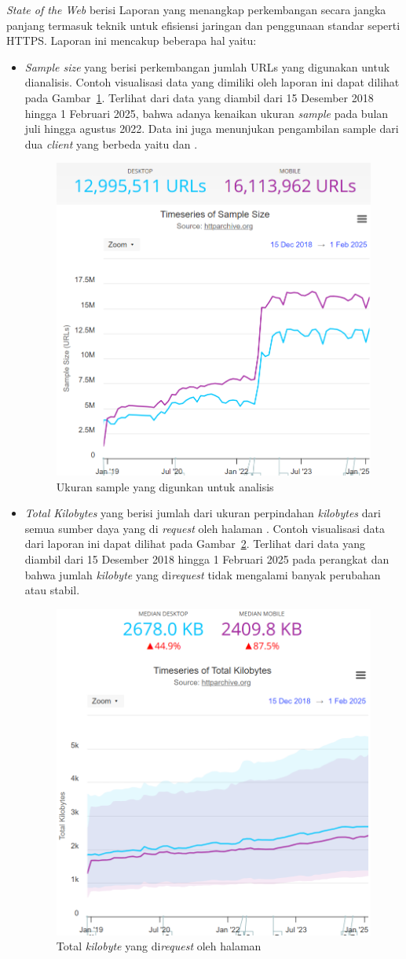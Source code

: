 \textit{State of the Web} berisi Laporan yang menangkap perkembangan \web secara jangka panjang  termasuk teknik untuk efisiensi jaringan dan penggunaan standar seperti HTTPS. Laporan ini mencakup beberapa hal yaitu:
\begin{itemize}
    \item \textit{Sample size} yang berisi perkembangan jumlah URLs yang digunakan untuk dianalisis. Contoh visualisasi data yang dimiliki oleh laporan ini dapat dilihat pada Gambar~\ref{fig:samplesize}. Terlihat dari data yang diambil dari 15 Desember 2018 hingga 1 Februari 2025, bahwa adanya kenaikan ukuran \textit{sample} pada bulan juli hingga agustus 2022. Data ini juga menunjukan pengambilan sample dari dua \textit{client} yang berbeda yaitu \desktop dan \mobile.
    \begin{figure}[H]
        \centering
        \includegraphics[width=0.4\linewidth]{Gambar/Contoh Sample Size.png}
        \caption{Ukuran sample \web yang digunkan untuk analisis}
        \label{fig:samplesize}
    \end{figure}

        
    \item \textit{Total Kilobytes} yang berisi jumlah dari ukuran perpindahan \textit{kilobytes} dari semua sumber daya yang di \textit{request} oleh halaman \web. Contoh visualisasi data dari laporan ini dapat dilihat pada Gambar~\ref{fig:totalkilo}. Terlihat dari data yang diambil dari 15 Desember 2018 hingga 1 Februari 2025 pada perangkat \desktop dan \mobile bahwa jumlah \textit{kilobyte} yang di\textit{request} tidak mengalami banyak perubahan atau stabil.
    \begin{figure}[H]
        \centering
        \includegraphics[width=0.4\linewidth]{Gambar/Contoh Total Kilo.png}
        \caption{Total \textit{kilobyte} yang di\textit{request} oleh halaman \web}
        \label{fig:totalkilo}
    \end{figure}


\end{itemize}
